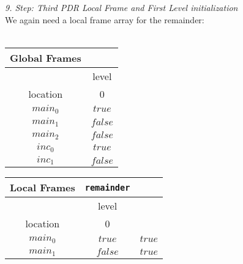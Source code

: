 \documentclass{article}
\begin{document}
	
	\textsl{9. Step: Third PDR Local Frame and First Level initialization} \\
	We again need a local frame array for the remainder: \\ \\
		\begin{minipage}{.5\textwidth}
		\setlength\tabcolsep{0.35em}
		\begin{center}
			\begin{tabu}{cc}
				Global Frames \\
				\toprule
				& level \\
				\cmidrule(lr){2-2}
				location & 0 \\
				$main_0$ & $true$ \\
				$main_1$ & $false$ \\
				$main_2$ & $false$ \\
				$inc_0$ & $true$ \\
				$inc_1$ & $false$\\
				\bottomrule
			\end{tabu}
		\end{center}
	\end{minipage}
	\hfill
	\begin{minipage}{.4\textwidth}
		\setlength\tabcolsep{0.35em}
		\begin{center}
			\begin{tabu}{ccc}
				Local Frames & \texttt{remainder}\\
				\toprule
				& level \\
				\cmidrule(lr){2-2}
				location & 0 \\
				\cmidrule{1-3}
				$main_0$ & $true$ & $true$ \\
				$main_1$ & $false$ & $true$\\
				\bottomrule
			\end{tabu}
		\end{center}	
	\end{minipage}
	
	\vspace*{2em}
	
\end{document}
